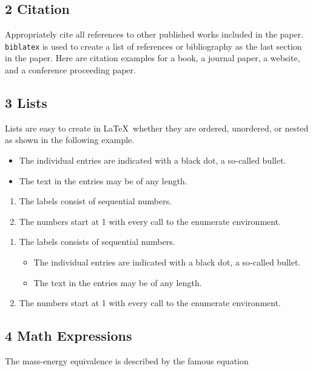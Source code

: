 \documentclass{ccsc_paper}
\begin{document}
\subsection{2 Citation}
Appropriately cite all references to other published works included in the paper. \texttt{biblatex} is used to create a list of references or bibliography as the last section in the paper. Here are citation examples for a book\cite{latexcompanion}, a journal paper\cite{einstein}, a website\cite{knuthwebsite}, and a conference proceeding paper\cite{maurer}.

\subsection{3 Lists}
Lists are easy to create in  \LaTeX\ whether they are ordered, unordered, or nested as shown in the following example.

\begin{itemize}[noitemsep]
  \item The individual entries are indicated with a black dot, a so-called bullet.
  \item The text in the entries may be of any length.
\end{itemize}

\begin{enumerate}[noitemsep]
  \item The labels consist of sequential numbers.
  \item The numbers start at 1 with every call to the enumerate environment.
\end{enumerate}

\begin{enumerate}[noitemsep]
   \item The labels consists of sequential numbers.
   \begin{itemize}[noitemsep]
     \item The individual entries are indicated with a black dot, a so-called bullet.
     \item The text in the entries may be of any length.
   \end{itemize}
   \item The numbers start at 1 with every call to the enumerate environment.
\end{enumerate}

\subsection{4 Math Expressions}
The mass-energy equivalence is described by the famous equation
\end{document}
